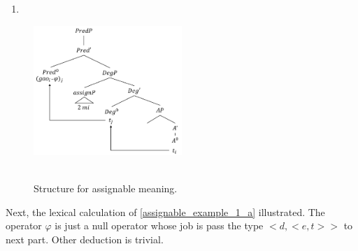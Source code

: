 \documentclass{ctexart}
\begin{document}
\begin{enumerate}
    \item \label{assignable_example_1_a_transitive_tree}
\end{enumerate}

\begin{figure}[H]
    \centering
    \includegraphics[width=0.5\textwidth]{Pic/assignment_meaning_transitive.png}
    \begin{caption}
        \\ \vspace{-1.1ex}
        Structure for assignable meaning.
    \end{caption}
\end{figure}

Next, the lexical calculation of \ref{assignable_example_1_a} illustrated. The operator $\varphi$ is just a null operator whose job is pass the type $<d,<e,t>>$ to next part. Other deduction is trivial.
\end{document}
